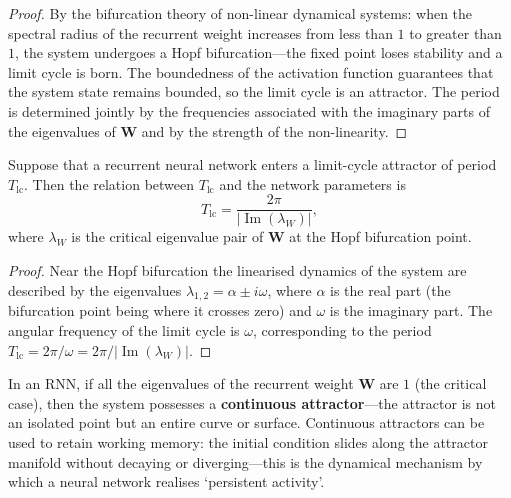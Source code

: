 \begin{proof}
By the bifurcation theory of non-linear dynamical systems: when the spectral radius of the recurrent weight increases from less than $1$ to greater than $1$, the system undergoes a Hopf bifurcation---the fixed point loses stability and a limit cycle is born. The boundedness of the activation function guarantees that the system state remains bounded, so the limit cycle is an attractor. The period is determined jointly by the frequencies associated with the imaginary parts of the eigenvalues of $\mathbf{W}$ and by the strength of the non-linearity.
\end{proof}

\begin{proposition}\label{prop:limit_cycle_period}
Suppose that a recurrent neural network enters a limit-cycle attractor of period $T_{\text{lc}}$. Then the relation between $T_{\text{lc}}$ and the network parameters is
\[
T_{\text{lc}}=\frac{2\pi}{|\operatorname{Im}(\lambda_W)|},
\]
where $\lambda_W$ is the critical eigenvalue pair of $\mathbf{W}$ at the Hopf bifurcation point.
\end{proposition}

\begin{proof}
Near the Hopf bifurcation the linearised dynamics of the system are described by the eigenvalues $\lambda_{1,2}=\alpha\pm i\omega$, where $\alpha$ is the real part (the bifurcation point being where it crosses zero) and $\omega$ is the imaginary part. The angular frequency of the limit cycle is $\omega$, corresponding to the period $T_{\text{lc}}=2\pi/\omega=2\pi/|\operatorname{Im}(\lambda_W)|$.
\end{proof}

\begin{example}\label{ex:continuous_attractor}
In an RNN, if all the eigenvalues of the recurrent weight $\mathbf{W}$ are $1$ (the critical case), then the system possesses a \textbf{continuous attractor}---the attractor is not an isolated point but an entire curve or surface. Continuous attractors can be used to retain working memory: the initial condition slides along the attractor manifold without decaying or diverging---this is the dynamical mechanism by which a neural network realises `persistent activity'.
\end{example}

